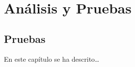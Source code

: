 \chapter{Análisis y Pruebas}
\label{cap:pruebas}



\section{Pruebas}
En este capítulo se ha descrito\ldots

	
	
